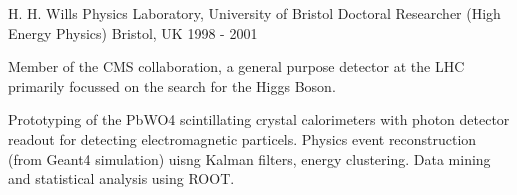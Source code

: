 \begin{cventries}
\cventry
{H. H. Wills Physics Laboratory, University of Bristol} %
{Doctoral Researcher (High Energy Physics)} %
{Bristol, UK} %
{1998 - 2001} %
{
  \begin{cvitems} %
    \item {
        Member of the CMS collaboration, a general purpose detector at the LHC primarily
        focussed on the search for the Higgs Boson.}
    \item {
        Prototyping of the PbWO4 scintillating crystal calorimeters with photon detector readout for 
        detecting electromagnetic particels. Physics event reconstruction (from Geant4 simulation) 
        uisng Kalman filters, energy clustering.  Data mining and statistical analysis using ROOT.
    }
  \end{cvitems}
}

\end{cventries}